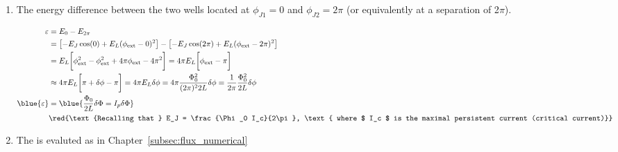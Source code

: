 \begin{enumerate}
\item  The  energy  difference  between  the  two  wells  located  at
  $\phi_{J1}=0$  and  $  \phi_{J2}=2\pi   $  (or  equivalently  at  a
  separation of 2$ \pi $).

  \begin{equation}
    \begin{aligned}
      \varepsilon &= E_0 - E_{2\pi} \\
      & = \left[-E_J\cos(0) + E_L(\phi_\text{ext}-0)^2\right] - \left[-E_J\cos(2\pi) + E_L(\phi_\text{ext}-2\pi)^2\right]\\
      & = E_L\bigg[\phi_\text{ext}^2 -\phi_\text{ext}^2 +4\pi\phi_\text{ext} -4\pi^2\bigg] =  4\pi E_L\bigg[\phi_\text{ext} -\pi\bigg]\\
      & \approx 4\pi E_L\bigg[\pi+\delta\phi -\pi\bigg] = 4\pi E_L\delta\phi = 4\pi \frac{\Phi_0^2}{(2\pi)^22L} \delta\phi = {\frac{1}{2\pi}\frac{\Phi_0^2}{2L}\delta\phi}\\
      \blue{\varepsilon} & = \blue{\frac{\Phi_0}{2L}\delta\Phi = I_p\delta\Phi}\\
      & \red{\text{Recalling that } E_J = \frac{\Phi_0 I_c}{2\pi}, \text{ where $ I_c $ is the maximal persistent current (critical current)}}\\
    \end{aligned}
  \end{equation}


\item               The                is  evaluted as
  in Chapter~\ref{subsec:flux_numerical}


\end{enumerate}
